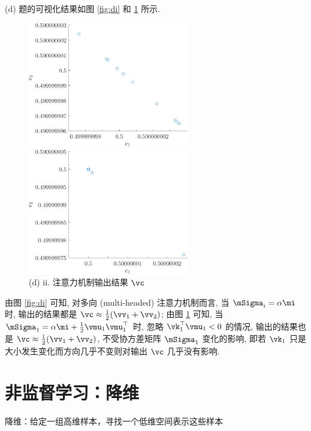 \documentclass[openany]{ctexbook}
\theoremstyle{kaiti}
\theoremstyle{normal}
\begin{document}
(d) 题的可视化结果如图 \ref{fig:di} 和 \ref{fig:dii} 所示. 
\begin{figure}[htbp]
  \centering
  \begin{minipage}[t]{0.48\textwidth}
    \centering
    \includegraphics[width=7cm]{di.pdf}
    \caption{(d) i. 注意力机制输出结果 $\vc$}
    \label{fig:di}
  \end{minipage}
  \begin{minipage}[t]{0.48\textwidth}
    \centering
    \includegraphics[width=7cm]{dii.pdf}
    \caption{(d) ii. 注意力机制输出结果 $\vc$}
    \label{fig:dii}
  \end{minipage}
\end{figure}

由图 \ref{fig:di} 可知, 对多向 (multi-headed) 注意力机制而言, 当 $\mSigma_{i}=\alpha \mi$ 时, 输出的结果都是 $\vc\approx\frac{1}{2}(\vv_{1}+\vv_{2})$; 由图 \ref{fig:dii} 可知, 当 $\mSigma_{1}=\alpha \mi+\frac{1}{2}\vmu_{1} \vmu_{1}^{\top}$ 时, 忽略 $\vk_{1}^{\top}\vmu_1<0$ 的情况, 输出的结果也是 $\vc\approx\frac{1}{2}(\vv_{1}+\vv_{2})$, 不受协方差矩阵 $\mSigma_{1}$ 变化的影响, 即若 $\vk_1$ 只是大小发生变化而方向几乎不变则对输出 $\vc$ 几乎没有影响.

\chapter{非监督学习：降维}

降维：给定一组高维样本，寻找一个低维空间表示这些样本
\end{document}

